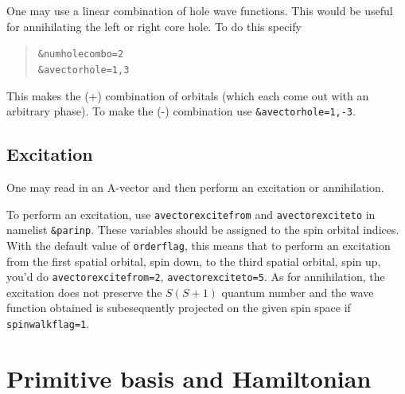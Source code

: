 \documentclass[10pt,leqno, oneside]{book}
\begin{document}
One may use a linear combination of hole wave functions.  This would be useful for annihilating the left or right core hole.  To do this specify
\begin{quote}
{\footnotesize 
\verb#&numholecombo=2# \\
\verb#&avectorhole=1,3# }
\end{quote}
This makes the (+) combination of orbitals (which each come out with an arbitrary phase).  To make the (-) combination use \verb#&avectorhole=1,-3#.

\subsection{Excitation}

One may read in an A-vector and then perform an excitation or annihilation.  

To perform an excitation, use \verb#avectorexcitefrom# and
\verb#avectorexciteto# in namelist \verb#&parinp#.  
These variables should be assigned to the spin orbital indices.  With the default value of \verb#orderflag#, this means
that to perform an excitation from the first spatial orbital, spin down, to the third spatial orbital, spin up,  you'd do \verb#avectorexcitefrom=2#, \verb#avectorexciteto=5#.  As for annihilation, the excitation does not preserve the $S(S+1)$ quantum number and the wave function obtained is
subesequently projected on the given spin space if \verb#spinwalkflag=1#.








\section{Primitive basis and Hamiltonian}
\end{document}
